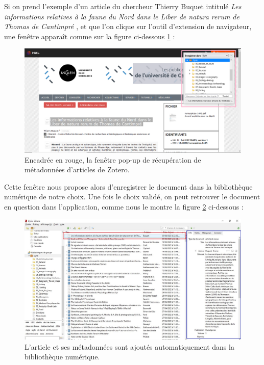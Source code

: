 \documentclass[a4paper,12pt,twoside]{book}
\begin{document}
Si on prend l'exemple d'un article du chercheur Thierry Buquet intitulé \og 
\textit{Les informations relatives à la faune du Nord dans le Liber de natura rerum de Thomas de Cantimpré}
\fg, et que l'on clique sur l'outil d'extension de navigateur, une fenêtre apparaît comme sur la figure ci-dessous \ref{zotero_ext} :

\begin{figure}[H]
    \centering
    \includegraphics[width=\linewidth]{img/partie_3/zotero_navig.png}
    \caption{Encadrée en rouge, la fenêtre pop-up de récupération de métadonnées d'articles de
    Zotero.}
    \label{zotero_ext}
\end{figure}

Cette fenêtre nous propose alors d'enregistrer le document dans la bibliothèque numérique de notre choix. Une fois le choix validé, on peut retrouver le document en question dans l'application, comme nous le montre la figure \ref{zotero_article} ci-dessous : 


\begin{figure}[H]
    \centering
    \includegraphics[width=15cm]{img/partie_3/zotero_article.JPG}
    \caption{L'article et ses métadonnées sont ajoutés automatiquement dans la bibliothèque numérique.}
    \label{zotero_article}
\end{figure}
\end{document}
